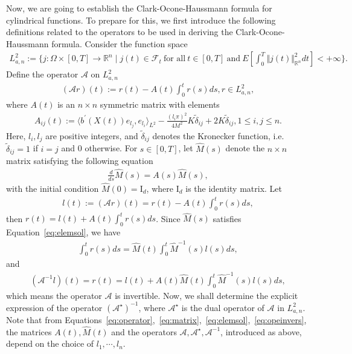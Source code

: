 \documentclass[11pt]{article}
\numberwithin{equation}{section}%
\numberwithin{figure}{section}%
\theoremstyle{remark}
\begin{document}
Now, we are going to establish the Clark-Ocone-Haussmann formula for cylindrical functions. To prepare for this, we first introduce the following definitions related to the operators to be used in deriving the Clark-Ocone-Haussmann formula. Consider the function space
\begin{align*}
	L_{a,n}^{2}:=
	\{j:\Omega\times[0,T]\rightarrow\mathbb{R}^{n}\mid j(t)\in\mathcal{F}_{t}\ \text{for all}\ t\in[0,T]\ \text{and} \ E[\int_{0}^{T}\Vert j(t)\Vert_{\mathbb{R}^{n}}^{2}dt]<+\infty\}.
\end{align*}	
Define the operator $\mathcal{A}$ on $L_{a,n}^{2}$
\begin{align}\label{eq:operator}
	(\mathcal{A} r)(t):=r(t)-A(t)\int_{0}^{t}r(s)ds, r\in L_{a,n}^{2},
\end{align}
where $A(t)$ is an $n\times n$ symmetric matrix with elements 
\begin{align}\label{eq:matrix}
	A_{ij}(t):=\langle  b^{\prime}\left(X\left( t\right)\right)e_{l_{j}},e_{l_{i}}\rangle_{L^{2}}-\frac{(l_{i}\pi)^{2}}{4M^{2}}K\tilde{\delta}_{ij}+2K\tilde{\delta}_{ij}, 1\leq i,j\leq n.
\end{align}
Here, $l_{i},l_{j}$ are positive integers, and $\tilde{\delta}_{ij}$ denotes the Kronecker function, i.e. $\tilde{\delta}_{ij}=1$ if $i=j$ and 0 otherwise. For $s\in[0,T]$, let $\hat{M}(s)$ denote the $n\times n$ matrix satisfying the following equation
	\begin{align}\label{eq:elemsol}
	\frac{d}{ds}\hat{M}(s)=A(s)\hat{M}(s),
\end{align}
with the initial condition $\hat{M}(0)=\text{I}_{d}$, where $\text{I}_{d}$ is the identity matrix. Let
\begin{align*}
	l(t):=(\mathcal{A} r)(t)=r(t)-A(t)\int_{0}^{t}r(s)ds,
\end{align*}
then $r(t)=l(t)+A(t)\int_{0}^{t}r(s)ds$. Since $\hat{M}(s)$ satisfies Equation~\eqref{eq:elemsol}, we have \begin{align*}
	\int_{0}^{t}r(s)ds=\hat{M}(t)\int_{0}^{t}\hat{M}^{-1}(s)l(s)ds,
\end{align*}
and
\begin{align}\label{eq:opeinvers}
	(\mathcal{A}^{-1}l)(t)=r(t)=l(t)+A(t)\hat{M}(t)\int_{0}^{t}\hat{M}^{-1}(s)l(s)ds,
\end{align}
which means the operator $\mathcal{A}$ is invertible. 
 Now, we shall determine the explicit expression of the operator $	(\mathcal{A}^{\star})^{-1}$, where $\mathcal{A}^{\star}$ is the dual operator of $\mathcal{A}$ in $L_{a,n}^{2}$. Note that from Equations~\eqref{eq:operator},~\eqref{eq:matrix},~\eqref{eq:elemsol},~\eqref{eq:opeinvers}, the matrices $A(t),\hat{M}(t)$ and the operators $\mathcal{A},\mathcal{A}^{\star},\mathcal{A}^{-1}$, introduced as above, depend on the choice of $l_{1},\cdots,l_{n}$.
\end{document}

